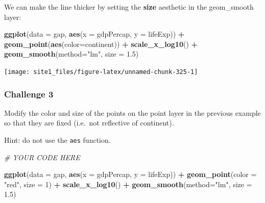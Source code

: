 \documentclass[]{book}
\newenvironment{Shaded}{\begin{snugshade}}{\end{snugshade}}
\newcommand{\KeywordTok}[1]{\textcolor[rgb]{0.13,0.29,0.53}{\textbf{#1}}}
\newcommand{\DataTypeTok}[1]{\textcolor[rgb]{0.13,0.29,0.53}{#1}}
\newcommand{\DecValTok}[1]{\textcolor[rgb]{0.00,0.00,0.81}{#1}}
\newcommand{\FloatTok}[1]{\textcolor[rgb]{0.00,0.00,0.81}{#1}}
\newcommand{\StringTok}[1]{\textcolor[rgb]{0.31,0.60,0.02}{#1}}
\newcommand{\CommentTok}[1]{\textcolor[rgb]{0.56,0.35,0.01}{\textit{#1}}}
\newcommand{\OperatorTok}[1]{\textcolor[rgb]{0.81,0.36,0.00}{\textbf{#1}}}
\newcommand{\NormalTok}[1]{#1}
\begin{document}
We can make the line thicker by setting the \textbf{size} aesthetic in
the geom\_smooth layer:

\begin{Shaded}
\begin{Highlighting}[]
\KeywordTok{ggplot}\NormalTok{(}\DataTypeTok{data =}\NormalTok{ gap, }\KeywordTok{aes}\NormalTok{(}\DataTypeTok{x =}\NormalTok{ gdpPercap, }\DataTypeTok{y =}\NormalTok{ lifeExp)) }\OperatorTok{+}\StringTok{ }
\StringTok{  }\KeywordTok{geom_point}\NormalTok{(}\KeywordTok{aes}\NormalTok{(}\DataTypeTok{color=}\NormalTok{continent)) }\OperatorTok{+}\StringTok{ }
\StringTok{  }\KeywordTok{scale_x_log10}\NormalTok{() }\OperatorTok{+}\StringTok{ }
\StringTok{  }\KeywordTok{geom_smooth}\NormalTok{(}\DataTypeTok{method=}\StringTok{"lm"}\NormalTok{, }\DataTypeTok{size =} \FloatTok{1.5}\NormalTok{)}
\end{Highlighting}
\end{Shaded}

\begin{center}\texttt{[image: site1\_files/figure-latex/unnamed-chunk-325-1]} \end{center}

\subsubsection*{Challenge 3}\label{challenge-3}

Modify the color and size of the points on the point layer in the
previous example so that they are fixed (i.e.~not reflective of
continent).

Hint: do not use the \texttt{aes} function.

\begin{Shaded}
\begin{Highlighting}[]
\CommentTok{# YOUR CODE HERE}

\KeywordTok{ggplot}\NormalTok{(}\DataTypeTok{data =}\NormalTok{ gap, }\KeywordTok{aes}\NormalTok{(}\DataTypeTok{x =}\NormalTok{ gdpPercap, }\DataTypeTok{y =}\NormalTok{ lifeExp)) }\OperatorTok{+}\StringTok{ }
\StringTok{  }\KeywordTok{geom_point}\NormalTok{(}\DataTypeTok{color =} \StringTok{"red"}\NormalTok{, }\DataTypeTok{size =} \DecValTok{1}\NormalTok{) }\OperatorTok{+}\StringTok{ }
\StringTok{  }\KeywordTok{scale_x_log10}\NormalTok{() }\OperatorTok{+}\StringTok{ }
\StringTok{  }\KeywordTok{geom_smooth}\NormalTok{(}\DataTypeTok{method=}\StringTok{"lm"}\NormalTok{, }\DataTypeTok{size =} \FloatTok{1.5}\NormalTok{)}
\end{Highlighting}
\end{Shaded}
\end{document}

